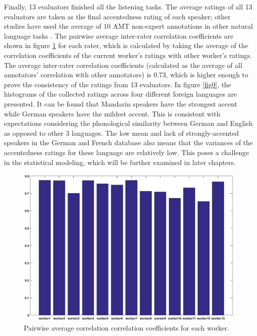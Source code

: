 Finally, 13 evaluators finished all the listening tasks. The average ratings of all 13 evaluators are taken as the final accentedness rating of each speaker; other studies have used the average of 10 AMT non-expert annotations in other natural language tasks \cite{snow2008cheap}. The pairwise average inter-rater correlation coefficients are shown in figure \ref{fig:pairwise_corr} for each rater, which is calculated by taking the average of the correlation coefficients of the current worker's ratings with other worker's ratings. The average inter-rater correlation coefficients (calculated as the average of all annotators' correlation with other annotators) is 0.73, which is higher enough to prove the consistency of the ratings from 13 evaluators. In figure \ref{fig0}, the histograms of the collected ratings across four different foreign languages are presented. It can be found that Mandarin speakers have the strongest accent while German speakers have the mildest accent. This is consistent with expectations considering the phonological similarity between German and English as opposed to other 3 languages. The low mean and lack of strongly-accented speakers in the German and French database also means that the variances of the accentedness ratings for these language are relatively low. This poses a challenge in the statistical modeling, which will be further examined in later chapters.

\begin{figure}[t]
\centering
\captionsetup{justification=centering}
\includegraphics[width = 0.8\linewidth]{figures/mean_pairwise_correlation_without_work4.eps}
\caption{Pairwise average correlation correlation coefficients for each worker.}
\label{fig:pairwise_corr}
\end{figure}

